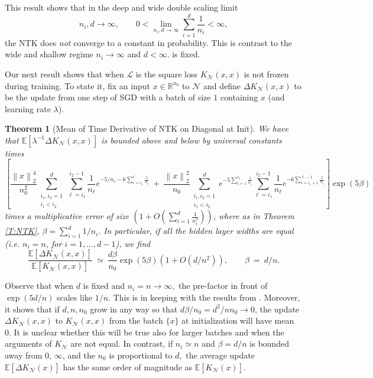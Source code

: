 \documentclass[11pt, reqno]{amsart}
\newtheorem{theorem}{Theorem}
\newcommand{\R}{{\mathbb R}}
\newcommand{\E}[1]{{\mathbb E}\left [#1\right]}
\newcommand{\gives}{\ensuremath{\rightarrow}}
\newcommand{\lr}[1]{\ensuremath{\left(#1 \right)}}
\newcommand{\norm}[1]{\left\lVert#1\right\rVert}
\newcommand{\set}[1]{\ensuremath{\{#1\}}}
\newcommand{\mN}{\mathcal N}
\begin{document}
\noindent This result shows that in the deep and wide double scaling limit 
\[n_i,d\gives \infty,\qquad 0<\lim_{n_i,d\gives \infty}\sum_{i=1}^d \frac{1}{n_i}<\infty,\]
the NTK does \emph{not} converge to a constant in probability. This is contrast to the wide and shallow regime $n_i\gives \infty$ and $d<\infty.$ is fixed.

Our next result shows that when $\mathcal L$ is the square loss $K_{\mN}(x,x)$ is not frozen during training. To state it, fix an input $x\in \R^{n_0}$ to $\mN$ and define $\Delta K_{\mN}(x,x)$ to be the update from one step of SGD with a batch of size $1$ containing $x$ (and learning rate $\lambda$). 
\begin{theorem}[Mean of Time Derivative of NTK on Diagonal at Init]\label{T:deriv}
 We have that $\E{\lambda^{-1}\Delta K_{\mN}(x,x)}$ is bounded above and below by universal constants times
\[\left[\frac{\norm{x}_2^4}{n_0^2}\sum_{\substack{i_1,i_2=1\\i_i<i_2}}^d \sum_{\ell=i_1}^{i_2-1} \frac{1}{n_\ell} e^{-5/n_\ell-6\sum_{i=i_1}^{\ell}\frac{1}{n_i}}
~+~
\frac{\norm{x}_2^2}{n_0}\sum_{\substack{i_i,i_2=1\\i_1<i_2}}^d e^{-5\sum_{i=1}^{i_1} \frac{1}{n_i}}\sum_{\ell=i_1}^{i_2-1} \frac{1}{n_\ell} e^{-6\sum_{i=i_1+1}^{\ell-1}\frac{1}{n_i}}\right]\exp\lr{5\beta}\]
times a multiplicative error of size $\lr{1+O\lr{\sum_{i=1}^d\frac{1}{n_i^2}}}$, where as in Theorem \ref{T:NTK}, $\beta = \sum_{i=1}^d 1/n_i.$ In particular, if all the hidden layer widths are equal (i.e. $n_i=n$, for $i=1,\ldots, d-1$), we find
\[\frac{\E{\Delta K_{\mN}(x,x)}}{\E{K_{\mN}(x,x)}}~\simeq~ \frac{d\beta}{n_0}\exp\lr{5\beta}\lr{1+O\lr{d/n^2}},\qquad \beta ~=~ d/n.\]
\end{theorem}

Observe that when $d$ is fixed and $n_i=n\gives \infty,$ the pre-factor in front of $\exp\lr{5d/n}$ scales like $1/n$. This is in keeping with the results from \cite{dyer2018asymptotics,jacot2018neural}. Moreover, it shows that if  $d,n,n_0$ grow in any way so that $d\beta/n_0 = d^2/n n_0 \gives 0$, the update $\Delta K_{\mN}(x,x)$ to $K_{\mN}(x,x)$ from the batch $\set{x}$ at initialization will have mean $0.$ It is unclear whether this will be true also for larger batches and when the arguments of $K_{\mN}$ are not equal. In contrast, if $n_i\simeq n$ and $\beta= d/n$ is bounded away from $0,\,\infty$, and the $n_0$ is proportional to $d,$ the average update $\E{\Delta K_{\mN}(x)}$ has the same order of magnitude as $\E{K_{\mN}(x)}$. 
\end{document}

